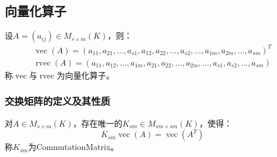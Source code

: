 \subsection{向量化算子}
\begin{definition}
	设$A=(a_{ij})\in M_{s\times m}(K)$，则：
	\begin{gather*}
		\operatorname{vec}(A)=(a_{11},a_{21},\dots,a_{s1},a_{12},a_{22},\dots,a_{s2},\dots,a_{1m},a_{2m},\dots,a_{sm})^T \\
		\operatorname{rvec}(A)=(a_{11},a_{12},\dots,a_{1m},a_{21},a_{22},\dots,a_{2m},\dots,a_{s1},a_{s2},\dots,a_{sm})
	\end{gather*}
	称$\operatorname{vec}$与$\operatorname{rvec}$为向量化算子。
\end{definition}
\subsubsection{交换矩阵的定义及其性质}
\begin{definition}
	对$A\in M_{s\times m}(K)$，存在唯一的$K_{sm}\in M_{sm\times sm}(K)$，使得：
	\begin{equation*}
		K_{sm}\operatorname{vec}(A)=\operatorname{vec}(A^T)
	\end{equation*}
	称$K_{sm}$为\gls{CommutationMatrix}。
\end{definition}

